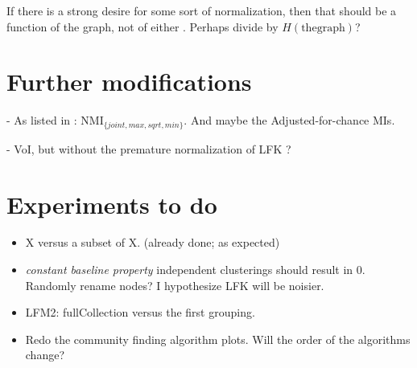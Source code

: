 \documentclass[9pt,technote]{IEEEtran}
\begin{document}
If there is a strong desire for some sort of normalization, then that should be a function of the graph, not of either \grouping.
Perhaps divide by $H(\mathrm{the graph})$?

\section{Further modifications}
- As listed in \cite{VinhEppsBailey}: NMI$_{\{joint,max,sqrt,min\}}$. And maybe the Adjusted-for-chance MIs.

- VoI, but without the premature normalization of LFK ?

\section{Experiments to do}
\begin{itemize}
	\item X versus a subset of X. (already done; as expected)
	\item \emph{constant baseline property} independent clusterings should result in 0. Randomly rename nodes? I hypothesize LFK will be noisier.
	\item LFM2: fullCollection versus the first grouping.
	\item Redo the community finding algorithm plots. Will the order of the algorithms change?
\end{itemize}

%

%

\end{document}
